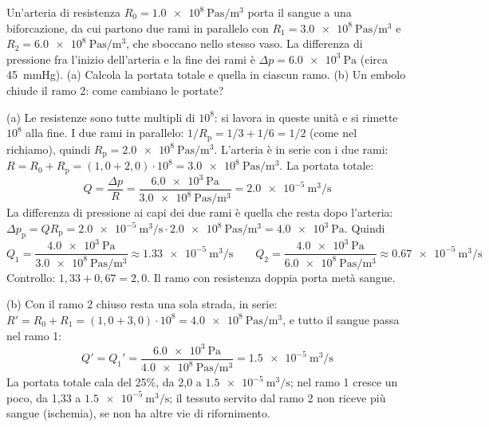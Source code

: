 \begin{esempio}
Un'arteria di resistenza $R_0 = \SI{1,0e8}{\pascal\second\per\metre\cubed}$ porta il sangue a una biforcazione, da cui partono due rami in parallelo con $R_1 = \SI{3,0e8}{\pascal\second\per\metre\cubed}$ e $R_2 = \SI{6,0e8}{\pascal\second\per\metre\cubed}$, che sboccano nello stesso vaso. La differenza di pressione fra l'inizio dell'arteria e la fine dei rami è $\Delta p = \SI{6,0e3}{\pascal}$ (circa \SI{45}{\mmHg}). (a) Calcola la portata totale e quella in ciascun ramo. (b) Un embolo chiude il ramo 2: come cambiano le portate?

(a) Le resistenze sono tutte multipli di $10^{8}$: si lavora in queste unità e si rimette $10^{8}$ alla fine. I due rami in parallelo: $1/R_\text{p} = 1/3 + 1/6 = 1/2$ (come nel richiamo), quindi $R_\text{p} = \SI{2,0e8}{\pascal\second\per\metre\cubed}$. L'arteria è in serie con i due rami: $R = R_0 + R_\text{p} = (1{,}0 + 2{,}0) \cdot 10^{8} = \SI{3,0e8}{\pascal\second\per\metre\cubed}$. La portata totale:
\[
  Q = \frac{\Delta p}{R} = \frac{\SI{6,0e3}{\pascal}}{\SI{3,0e8}{\pascal\second\per\metre\cubed}} = \SI{2,0e-5}{\metre\cubed\per\second}
\]
La differenza di pressione ai capi dei due rami è quella che resta dopo l'arteria: $\Delta p_\text{p} = Q R_\text{p} = \SI{2,0e-5}{\metre\cubed\per\second} \cdot \SI{2,0e8}{\pascal\second\per\metre\cubed} = \SI{4,0e3}{\pascal}$. Quindi
\[
  Q_1 = \frac{\SI{4,0e3}{\pascal}}{\SI{3,0e8}{\pascal\second\per\metre\cubed}} \approx \SI{1,33e-5}{\metre\cubed\per\second}
  \qquad
  Q_2 = \frac{\SI{4,0e3}{\pascal}}{\SI{6,0e8}{\pascal\second\per\metre\cubed}} \approx \SI{0,67e-5}{\metre\cubed\per\second}
\]
Controllo: $1{,}33 + 0{,}67 = 2{,}0$. Il ramo con resistenza doppia porta metà sangue.

(b) Con il ramo 2 chiuso resta una sola strada, in serie: $R' = R_0 + R_1 = (1{,}0 + 3{,}0) \cdot 10^{8} = \SI{4,0e8}{\pascal\second\per\metre\cubed}$, e tutto il sangue passa nel ramo 1:
\[
  Q' = Q_1' = \frac{\SI{6,0e3}{\pascal}}{\SI{4,0e8}{\pascal\second\per\metre\cubed}} = \SI{1,5e-5}{\metre\cubed\per\second}
\]
La portata totale cala del 25\%, da 2,0 a $\SI{1,5e-5}{\metre\cubed\per\second}$; nel ramo 1 cresce un poco, da 1,33 a $\SI{1,5e-5}{\metre\cubed\per\second}$; il tessuto servito dal ramo 2 non riceve più sangue (ischemia), se non ha altre vie di rifornimento.
\end{esempio}



